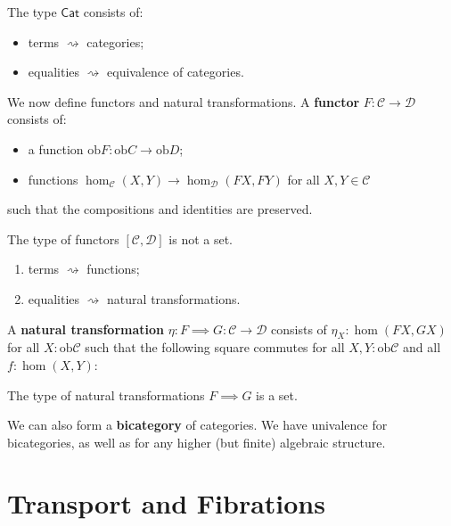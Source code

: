 \documentclass{amsart}
\theoremstyle{definition}
\newcommand{\Cat}{\ensuremath{\mathsf{Cat}}}
\newcommand{\ob}{\ensuremath{\mathrm{ob}}}
\renewcommand{\emph}{\textbf}
\begin{document}
The type $\Cat$ consists of:

\begin{itemize}
    \item terms $\rightsquigarrow$ categories;
    \item equalities $\rightsquigarrow$ equivalence of categories.
\end{itemize}

We now define functors and natural transformations. A \emph{functor} $F: \mathcal{C}\to\mathcal{D}$ consists of:
\begin{itemize}
    \item a function $\ob{F}:\ob{C}\to\ob{D}$;
    \item functions $\hom_{\mathcal C}(X,Y)\to \hom_{\mathcal D}(FX,FY)$ for all $X,Y\in \mathcal C$
\end{itemize}
such that the compositions and identities are preserved.

The type of functors $[\mathcal C, \mathcal D]$ is not a set.
\begin{enumerate}
    \item terms $\rightsquigarrow$ functions;
    \item equalities $\rightsquigarrow$ natural transformations.
\end{enumerate}

A \emph{natural transformation} $\eta: F \implies G: \mathcal{C}\to\mathcal{D}$ consists of $\eta_X:\hom(FX,GX)$ for all $X:\ob{\mathcal{C}}$ such that the following square commutes for all $X,Y:\ob{\mathcal{C}}$ and all $f:\hom(X,Y)$:

\begin{center}
\end{center}

The type of natural transformations $F\implies G$ is a set.

We can also form a \emph{bicategory} of categories. We have univalence for bicategories, as well as for any higher (but finite) algebraic structure.





\appendix

\section{Transport and Fibrations}
\label{sec:transport-explanation}
\end{document}
